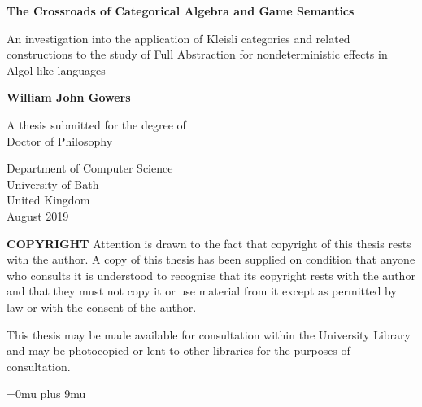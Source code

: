 \documentclass[11pt]{report}
\begin{document}
\begin{titlepage}
  \begin{center}
    \Huge
    \textbf{The Crossroads of Categorical Algebra and Game Semantics}
 
    \vspace{0.2cm}
    \LARGE
    An investigation into the application of Kleisli categories and related constructions to the study of Full Abstraction for nondeterministic effects in Algol-like languages
 
    \vspace{0.3cm}
 
    \textbf{William John Gowers}
 
    A thesis submitted for the degree of\\
    Doctor of Philosophy
 
    \vspace{0.1cm}
 
    \Large
    Department of Computer Science\\
    University of Bath\\
    United Kingdom\\
    August 2019

    \textbf{COPYRIGHT}
    Attention is drawn to the fact that copyright of this thesis rests with the author. A copy of this thesis has
    been supplied on condition that anyone who consults it is understood to recognise that its copyright rests
    with the author and that they must not copy it or use material from it except as permitted by law or with
    the consent of the author. 
    
    This thesis may be made available for consultation within
    the University Library and may be photocopied or lent to other libraries
    for the purposes of consultation. \ul{\hspace{64pt}}
 
  \end{center}
\end{titlepage}

\let\OldClearpage\clearpage
\let\clearpage\relax

\tableofcontents
\listoffigures

\let\clearpage\OldClearpage
\newpage

%
%
%
%

%
%

\Urlmuskip=0mu plus 9mu\relax


\end{document}
